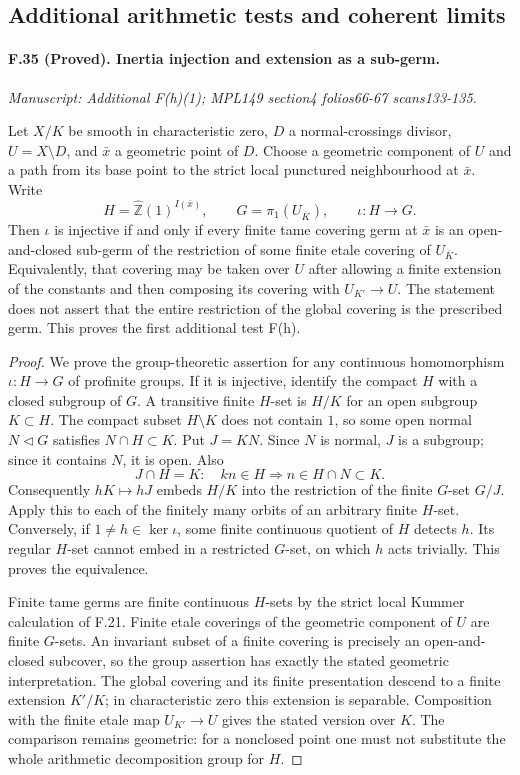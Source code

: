 \subsection{Additional arithmetic tests and coherent limits}

\paragraph{F.35 (Proved). Inertia injection and extension as a sub-germ.}
\textit{Manuscript: Additional F(h)(1); MPL149 section4 folios66-67 scans133-135.}

Let $X/K$ be smooth in characteristic zero, $D$ a normal-crossings divisor,
$U=X\setminus D$, and $\bar x$ a geometric point of $D$. Choose a geometric
component of $U$ and a path from its base point to the strict local
punctured neighbourhood at $\bar x$. Write
\[
 H=\widehat{\mathbb Z}(1)^{I(\bar x)},\qquad
 G=\pi_1(U_{\overline K}),\qquad \iota:H\longrightarrow G.
\]
Then $\iota$ is injective if and only if every finite tame covering germ
at $\bar x$ is an open-and-closed sub-germ of the restriction of some
finite etale covering of $U_{\overline K}$. Equivalently, that covering
may be taken over $U$ after allowing a finite extension of the constants
and then composing its covering with $U_{K'}\to U$. The statement does
not assert that the entire restriction of the global covering is the
prescribed germ. This proves the first additional test F(h).

\begin{proof}
We prove the group-theoretic assertion for any continuous homomorphism
$\iota:H\to G$ of profinite groups. If it is injective, identify the compact
$H$ with a closed subgroup of $G$. A transitive finite $H$-set is $H/K$
for an open subgroup $K\subset H$. The compact subset $H\setminus K$
does not contain $1$, so some open normal $N\lhd G$ satisfies
$N\cap H\subset K$. Put $J=KN$. Since $N$ is normal, $J$ is a subgroup;
since it contains $N$, it is open. Also
\[
 J\cap H=K:
 \quad kn\in H\Longrightarrow n\in H\cap N\subset K.
\]
Consequently $hK\mapsto hJ$ embeds $H/K$ into the restriction of the
finite $G$-set $G/J$. Apply this to each of the finitely many orbits of
an arbitrary finite $H$-set. Conversely, if $1\ne h\in\ker\iota$, some
finite continuous quotient of $H$ detects $h$. Its regular $H$-set
cannot embed in a restricted $G$-set, on which $h$ acts trivially.
This proves the equivalence.

Finite tame germs are finite continuous $H$-sets by the strict local
Kummer calculation of F.21. Finite etale coverings of the geometric
component of $U$ are finite $G$-sets. An invariant subset of a finite
covering is precisely an open-and-closed subcover, so the group assertion
has exactly the stated geometric interpretation. The global covering and its finite presentation descend to a finite
extension $K'/K$; in characteristic
zero this extension is separable. Composition with the finite etale map
$U_{K'}\to U$ gives the stated version over $K$. The comparison remains
geometric: for a nonclosed point one must not substitute the whole
arithmetic decomposition group for $H$.
\end{proof}

